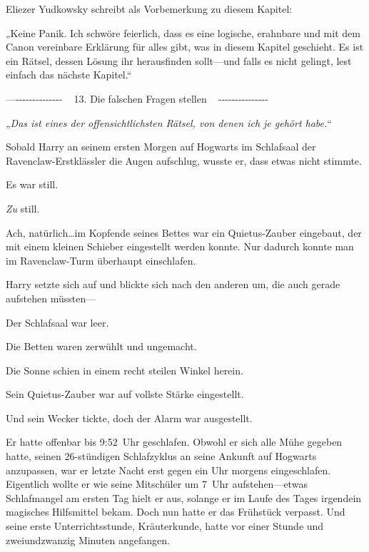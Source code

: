 

\hypertarget{die-falschen-fragen-stellen}{%

Eliezer Yudkowsky schreibt als Vorbemerkung zu diesem Kapitel:

„Keine Panik. Ich schwöre feierlich, dass es eine logische, erahnbare und mit dem Canon vereinbare Erklärung für alles gibt, was in diesem Kapitel geschieht. Es ist ein Rätsel, dessen Lösung ihr herausfinden sollt—und falls es nicht gelingt, lest einfach das nächste Kapitel.“

—\/-\/-\/-\/-\/-\/-\/-\/-\/-\/-\/-\/-\/-\/- ~ 13. Die falschen Fragen stellen ~ -\/-\/-\/-\/-\/-\/-\/-\/-\/-\/-\/-\/-\/-\/-

\later

„\emph{Das ist eines der offensichtlichsten Rätsel, von denen ich je gehört habe.}“

\later

Sobald Harry an seinem ersten Morgen auf Hogwarts im Schlafsaal der Ravenclaw-Erstklässler die Augen aufschlug, wusste er, dass etwas nicht stimmte.

Es war still.

\emph{Zu} still.

Ach, natürlich…im Kopfende seines Bettes war ein Quietus-Zauber eingebaut, der mit einem kleinen Schieber eingestellt werden konnte. Nur dadurch konnte man im Ravenclaw-Turm überhaupt einschlafen.

Harry setzte sich auf und blickte sich nach den anderen um, die auch gerade aufstehen müssten—

Der Schlafsaal war leer.

Die Betten waren zerwühlt und ungemacht.

Die Sonne schien in einem recht steilen Winkel herein.

Sein Quietus-Zauber war auf vollste Stärke eingestellt.

Und sein Wecker tickte, doch der Alarm war ausgestellt.

Er hatte offenbar bis 9:52~Uhr geschlafen. Obwohl er sich alle Mühe gegeben hatte, seinen 26-stündigen Schlafzyklus an seine Ankunft auf Hogwarts anzupassen, war er letzte Nacht erst gegen ein Uhr morgens eingeschlafen. Eigentlich wollte er wie seine Mitschüler um 7~Uhr aufstehen—etwas Schlafmangel am ersten Tag hielt er aus, solange er im Laufe des Tages irgendein magisches Hilfsmittel bekam. Doch nun hatte er das Frühstück verpasst. Und seine erste Unterrichtsstunde, Kräuterkunde, hatte vor einer Stunde und zweiundzwanzig Minuten angefangen.

}
